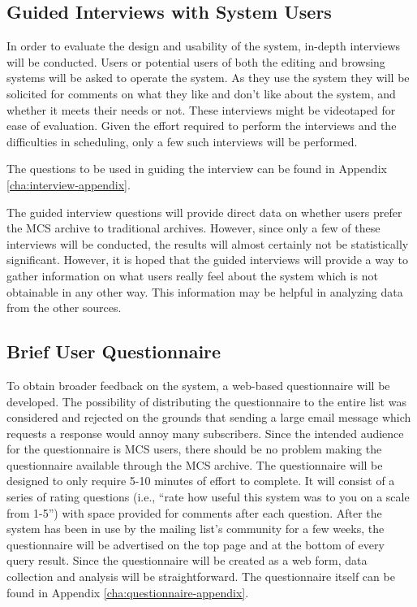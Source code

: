 \subsection{Guided Interviews with System Users}
In order to evaluate the design and usability of the system, in-depth
interviews will be conducted. Users or potential users of both the editing and
browsing systems will be asked to operate the system. As they use the system
they will be solicited for comments on what they like and don't like about the
system, and whether it meets their needs or not. These interviews might be
videotaped for ease of evaluation. Given the effort required to perform the
interviews and the difficulties in scheduling, only a few such interviews will
be performed.

The questions to be used in guiding the interview can be found in Appendix
\ref{cha:interview-appendix}.

The guided interview questions will provide direct data on whether users prefer
the MCS archive to traditional archives. However, since only a few of these
interviews will be conducted, the results will almost certainly not be
statistically significant. However, it is hoped that the guided interviews will
provide a way to gather information on what users really feel about the system
which is not obtainable in any other way. This information may be helpful in
analyzing data from the other sources.
 
\subsection{Brief User Questionnaire}
To obtain broader feedback on the system, a web-based questionnaire will be
developed. The possibility of distributing the questionnaire to the entire list
was considered and rejected on the grounds that sending a large email message
which requests a response would annoy many subscribers. Since the intended
audience for the questionnaire is MCS users, there should be no problem making
the questionnaire available through the MCS archive. The questionnaire will be
designed to only require 5-10 minutes of effort to complete. It will consist of
a series of rating questions (i.e., ``rate how useful this system was to you on
a scale from 1-5'') with space provided for comments after each question. After
the system has been in use by the mailing list's community for a few weeks, the
questionnaire will be advertised on the top page and at the bottom of every
query result. Since the questionnaire will be created as a web form, data
collection and analysis will be straightforward. The questionnaire itself can
be found in Appendix \ref{cha:questionnaire-appendix}.

